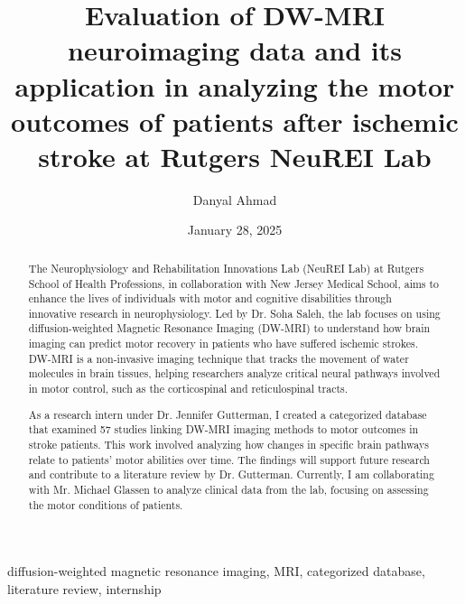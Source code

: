 ﻿\documentclass[12pt,conference,onecolumn]{IEEEtran}
\title{Evaluation of DW-MRI neuroimaging data and its application in analyzing the motor outcomes of patients after ischemic stroke at Rutgers NeuREI Lab}
\author{Danyal Ahmad}
\date{January 28, 2025}
\begin{document}
\maketitle 

\begin{abstract}
The Neurophysiology and Rehabilitation Innovations Lab (NeuREI Lab) at Rutgers School of Health Professions, in collaboration with New Jersey Medical School, aims to enhance the lives of individuals with motor and cognitive disabilities through innovative research in neurophysiology. Led by Dr. Soha Saleh, the lab focuses on using diffusion-weighted Magnetic Resonance Imaging (DW-MRI) to understand how brain imaging can predict motor recovery in patients who have suffered ischemic strokes. DW-MRI is a non-invasive imaging technique that tracks the movement of water molecules in brain tissues, helping researchers analyze critical neural pathways involved in motor control, such as the corticospinal and reticulospinal tracts.

As a research intern under Dr. Jennifer Gutterman, I created a categorized database that examined 57 studies linking DW-MRI imaging methods to motor outcomes in stroke patients. This work involved analyzing how changes in specific brain pathways relate to patients' motor abilities over time. The findings will support future research and contribute to a literature review by Dr. Gutterman. Currently, I am collaborating with Mr. Michael Glassen to analyze clinical data from the lab, focusing on assessing the motor conditions of patients.
\end{abstract}

\begin{IEEEkeywords}
diffusion-weighted magnetic resonance imaging, MRI, categorized database, literature review, internship
\end{IEEEkeywords}
\end{document}
